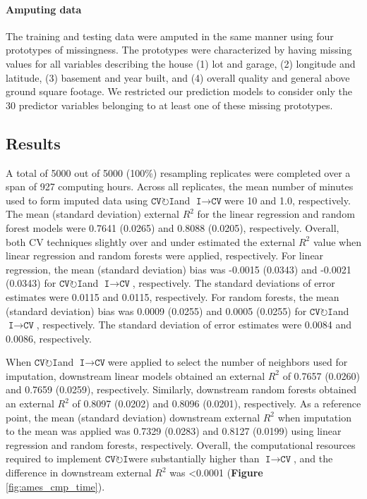 \documentclass[AMA,STIX1COL,doublespace]{WileyNJD-v2}
\begin{document}
\paragraph{Amputing data}

The training and testing data were amputed in the same manner using four
prototypes of missingness. The prototypes were characterized by having
missing values for all variables describing the house (1) lot and
garage, (2) longitude and latitude, (3) basement and year built, and (4)
overall quality and general above ground square footage. We restricted
our prediction models to consider only the 30 predictor variables
belonging to at least one of these missing prototypes.

\subsection{Results}

A total of 5000 out of 5000 (100\%) resampling replicates were completed
over a span of 927 computing hours. Across all replicates, the mean
number of minutes used to form imputed data using
$\texttt{CV}\!\circlearrowright\!\texttt{I}$\space and
$\texttt{I}\!\!\rightarrow\!\texttt{CV}$\space were 10 and 1.0,
respectively. The mean (standard deviation) external \(R^2\) for the
linear regression and random forest models were 0.7641 (0.0265) and
0.8088 (0.0205), respectively. Overall, both CV techniques slightly over
and under estimated the external \(R^2\) value when linear regression
and random forests were applied, respectively. For linear regression,
the mean (standard deviation) bias was -0.0015 (0.0343) and -0.0021
(0.0343) for $\texttt{CV}\!\circlearrowright\!\texttt{I}$\space and
$\texttt{I}\!\!\rightarrow\!\texttt{CV}$, respectively. The standard
deviations of error estimates were 0.0115 and 0.0115, respectively. For
random forests, the mean (standard deviation) bias was 0.0009 (0.0255)
and 0.0005 (0.0255) for
$\texttt{CV}\!\circlearrowright\!\texttt{I}$\space and
$\texttt{I}\!\!\rightarrow\!\texttt{CV}$, respectively. The standard
deviation of error estimates were 0.0084 and 0.0086, respectively.

When $\texttt{CV}\!\circlearrowright\!\texttt{I}$\space and
$\texttt{I}\!\!\rightarrow\!\texttt{CV}$\space were applied to select
the number of neighbors used for imputation, downstream linear models
obtained an external \(R^2\) of 0.7657 (0.0260) and 0.7659 (0.0259),
respectively. Similarly, downstream random forests obtained an external
\(R^2\) of 0.8097 (0.0202) and 0.8096 (0.0201), respectively. As a
reference point, the mean (standard deviation) downstream external
\(R^2\) when imputation to the mean was applied was 0.7329 (0.0283) and
0.8127 (0.0199) using linear regression and random forests,
respectively. Overall, the computational resources required to implement
$\texttt{CV}\!\circlearrowright\!\texttt{I}$\space were substantially
higher than $\texttt{I}\!\!\rightarrow\!\texttt{CV}$\space, and the
difference in downstream external \(R^2\) was \textless0.0001
(\textbf{Figure} \ref{fig:ames_cmp_time}).
\end{document}
